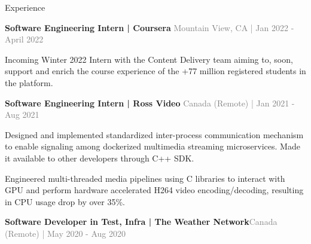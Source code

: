 \documentclass[hidelinks]{resume} %
\begin{document}
\vspace{-.20cm}
\begin{rSection}{Experience}
\vspace{-.1cm}
\begin{rSubsection}{\textbf{Software Engineering Intern | Coursera} }{\textcolor{gray}{\small Mountain View, CA | Jan 2022 - April 2022}}{}

    \begin{bulletpoints}
        \vspace{-.10cm}
        \item Incoming Winter 2022 Intern with the Content Delivery team aiming to, soon, support and enrich the course experience of the +77 million registered students in the platform.
        \vspace{-.10cm}
    \end{bulletpoints}
\end{rSubsection}
\begin{rSubsection}{\textbf{Software Engineering Intern | Ross Video} }{\textcolor{gray}{\small Canada (Remote) | Jan 2021 - Aug 2021}}{}

    \begin{bulletpoints}
        \vspace{-.10cm}
        \item Designed and implemented standardized inter-process communication mechanism to enable signaling among dockerized multimedia streaming microservices. Made it available to other developers through C++ SDK.
        \vspace{-.13cm}
        \item Engineered multi-threaded media pipelines using C libraries to interact with GPU and perform hardware accelerated H264 video encoding/decoding, resulting in CPU usage drop by over 35\%.
        \vspace{-.10cm}
    \end{bulletpoints}
\end{rSubsection}
\begin{rSubsection}{\textbf{Software Developer in Test, Infra | The Weather Network}}{\textcolor{gray}{\small Canada (Remote) | May 2020 - Aug 2020}}{}


\end{rSubsection}
\end{rSection}
\end{document}
